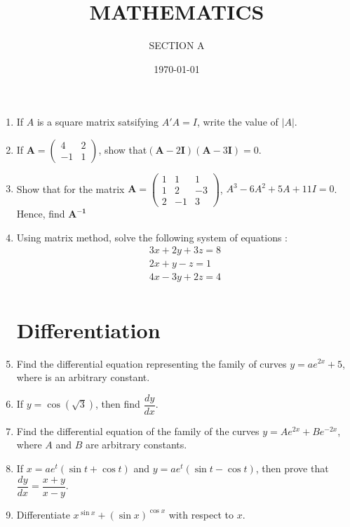 \documentclass[2pt,-letter paper]{article}
\title{MATHEMATICS}
\author{SECTION A}
\date{\today}
\let\vec\mathbf{}
\let\vec\mathbf{}
\let\vec\mathbf{}
\providecommand{\brak}[1]{\ensuremath{\left(#1\right)}}
\newcommand{\myvec}[1]{\ensuremath{\begin{pmatrix}#1\end{pmatrix}}}
\begin{document}
\maketitle

\begin{enumerate}
\section{Matrix}
\item If $A$ is a square matrix satsifying $A'A=I$, write the value of $\vert A \vert$.
\item If $\vec{A}= \myvec{4&2\\-1& 1}$, show that$\brak{\vec{A}-2\vec{I}}\brak{\vec{A}-3\vec{I}}= 0$.
\item Show that for the matrix $\vec{A}=\myvec{1&1&1 \\ 1&2&-3 \\ 2&-1&3}$, ${A}^3-6{A}^2+5{A}+11{I}=0$. Hence, find $\vec{A^{-1}}$
	\item Using matrix method, solve the following system of equations :
		\begin{align*}
			{3x+2y+3z}=8 \\
			{2x+y-z}=1 \\
			{4x-3y+2z}=4 \\
		\end{align*}
\section{Differentiation}
\item Find the differential equation representing the family of curves $y=ae^{2x}+5$, where  is an arbitrary constant.
\item If $y=\cos(\sqrt{3})$, then find $\dfrac{dy}{dx}$.
\item Find the differential equation of the family of the curves $y = Ae^{2x} + Be^{-2x}$, where $A$ and $B$ are arbitrary constants.
\item If ${x} = ae^{t}\brak{\sin{t}+\cos{t}}$ and ${y} = ae^{t}\brak{\sin{t}-\cos{t}}$, then prove that $\dfrac{dy}{dx} = \dfrac{x+y}{x-y}$.
\item Differentiate $x^{\sin x} + \brak{\sin x}^{\cos x}$ with respect to $x$.

\end{enumerate}
\end{document}
